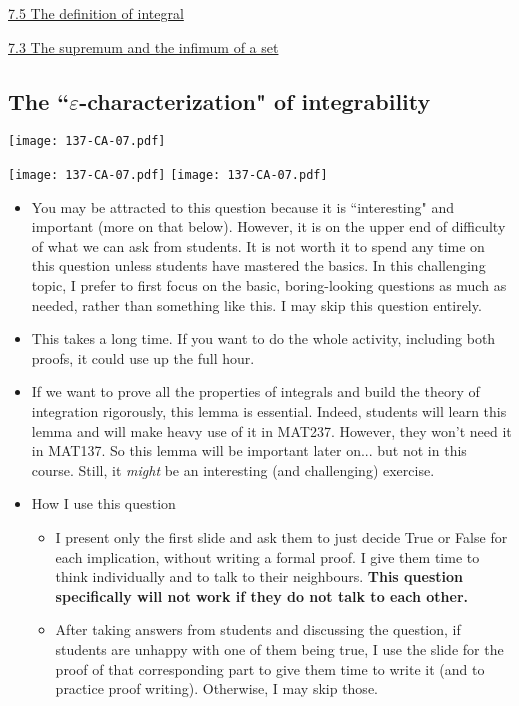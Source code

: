\documentclass[11pt]{article}
\newcommand{\e}{\varepsilon}
\newcommand{\nl}{\hfill \vspace{-1.1\baselineskip}} %
\newcommand{\viii}{\hspace{8mm} \href{https://www.youtube.com/watch?v=4qNstDwlh9I&list=PLlwePzQY_wW9vqCkUudCmoOvnNmr9vMuJ&index=3}{7.3 The supremum and the infimum of a set}}
\newcommand{\vv}{\hspace{8mm} \href{https://www.youtube.com/watch?v=dZ_TWQbksbg&list=PLlwePzQY_wW9vqCkUudCmoOvnNmr9vMuJ&index=5}{7.5 The definition of integral}}
\begin{document}
\begin{videos}
\vv

\viii
\end{videos}

\newpage
\subsection{The ``$\e$-characterization" of integrability}

\begin{center}
{ \texttt{[image: 137-CA-07.pdf]}} 

{ \texttt{[image: 137-CA-07.pdf]}} \quad
{ \texttt{[image: 137-CA-07.pdf]}} 
\end{center}

\begin{warning}
\nl
	\begin{itemize}
		\item You may be attracted to this question because it is ``interesting" and important (more on that below).  However, it is on the upper end of difficulty of what we can ask from students.  It is not worth it to spend any time on this question unless students have mastered the basics.    In this challenging topic, I prefer to first focus on the basic, boring-looking questions as much as needed, rather than something like this.   I may skip this question entirely.
		\item This takes a long time.  If you want to do the whole activity, including both proofs, it could use up the full hour.
	\end{itemize}
\end{warning}


\begin{comments}
\nl
	\begin{itemize}
		\item   If we want to prove all the properties of integrals and build the theory of integration rigorously, this lemma is essential.  Indeed, students will learn this lemma and will make heavy use of it in MAT237.  However, they won't need it in MAT137.  So this lemma will be important later on... but not in this course.  Still, it \emph{might} be an interesting (and challenging) exercise.
		\item   How I use this question
			\begin{itemize}
				\item  I present only the first slide and ask them to just decide True or False for each implication, without writing a formal proof.   I give them time to think individually and to talk to their neighbours.  \textbf{This question specifically will not work if they do not talk to each other.}
				\item After taking answers from students and discussing the question, if students are unhappy with one of them being true, I use the slide for the proof of that corresponding part to give them time to write it (and to practice proof writing).  Otherwise, I may skip those.
			\end{itemize}
		
	\end{itemize}
\end{comments}
\end{document}
